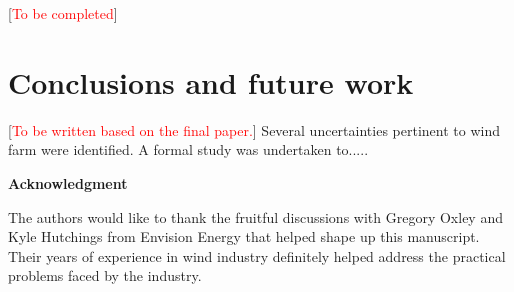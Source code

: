\documentclass[]{aiaa-tc}%
\begin{document}
[\textcolor{red}{To be completed}]

\section{Conclusions and future work}
[\textcolor{red}{To be written based on the final paper.}]
Several uncertainties pertinent to wind farm were identified. A formal study was undertaken to.....

\vspace{20px}

\textbf{Acknowledgment}

The authors would like to thank the fruitful discussions with Gregory Oxley and Kyle Hutchings from Envision Energy that helped shape up this manuscript. Their years of experience in wind industry definitely helped address the practical problems faced by the industry.
\end{document}

